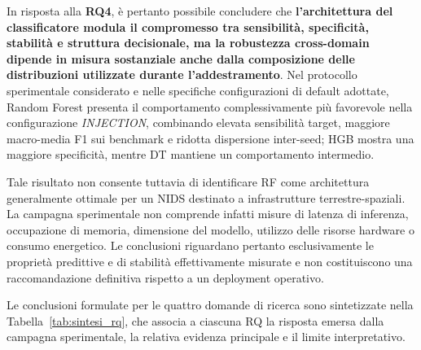 In risposta alla \textbf{RQ4}, è pertanto possibile concludere che \textbf{l'architettura del classificatore modula il compromesso tra sensibilità, specificità, stabilità e struttura decisionale, ma la robustezza cross-domain dipende in misura sostanziale anche dalla composizione delle distribuzioni utilizzate durante l'addestramento}.
Nel protocollo sperimentale considerato e nelle specifiche configurazioni di default adottate, Random Forest presenta il comportamento complessivamente più favorevole nella configurazione \textit{INJECTION}, combinando elevata sensibilità target, maggiore macro-media F1 sui benchmark e ridotta dispersione inter-seed; HGB mostra una maggiore specificità, mentre DT mantiene un comportamento intermedio.

Tale risultato non consente tuttavia di identificare RF come architettura generalmente ottimale per un NIDS destinato a infrastrutture terrestre-spaziali.
La campagna sperimentale non comprende infatti misure di latenza di inferenza, occupazione di memoria, dimensione del modello, utilizzo delle risorse hardware o consumo energetico.
Le conclusioni riguardano pertanto esclusivamente le proprietà predittive e di stabilità effettivamente misurate e non costituiscono una raccomandazione definitiva rispetto a un deployment operativo.

Le conclusioni formulate per le quattro domande di ricerca sono sintetizzate nella Tabella~\ref{tab:sintesi_rq}, che associa a ciascuna RQ la risposta emersa dalla campagna sperimentale, la relativa evidenza principale e il limite interpretativo.

